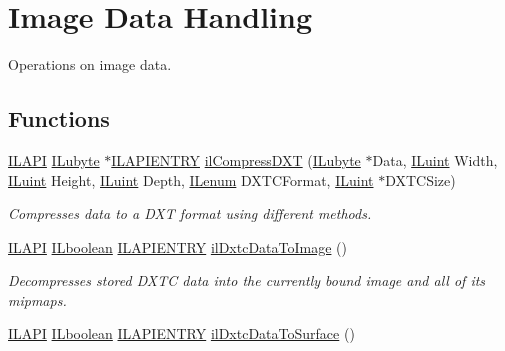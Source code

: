 \hypertarget{group__data}{\section{Image Data Handling}
\label{group__data}
}


Operations on image data.  


\subsection*{Functions}
\begin{DoxyCompactItemize}
\item 
\hyperlink{_i_l_8h_aedb0c8b2b033d0612e3d784d2f598758}{I\+L\+A\+P\+I} \hyperlink{group__il__types_ga057357939bc5a12e8061715453568519}{I\+Lubyte} $\ast$\hyperlink{_i_l_8h_a69c08a8d06df986f7e46f209d131ef2f}{I\+L\+A\+P\+I\+E\+N\+T\+R\+Y} \hyperlink{group__data_ga016b03ccbf86f6ba37d6c24b3357f9d1}{il\+Compress\+D\+X\+T} (\hyperlink{group__il__types_ga057357939bc5a12e8061715453568519}{I\+Lubyte} $\ast$Data, \hyperlink{group__il__types_gaff8e86a1072c8d7cfe387fb87c6ed8e1}{I\+Luint} Width, \hyperlink{group__il__types_gaff8e86a1072c8d7cfe387fb87c6ed8e1}{I\+Luint} Height, \hyperlink{group__il__types_gaff8e86a1072c8d7cfe387fb87c6ed8e1}{I\+Luint} Depth, \hyperlink{group__il__types_ga62ca73445716183ef42b1f3906a45ed0}{I\+Lenum} D\+X\+T\+C\+Format, \hyperlink{group__il__types_gaff8e86a1072c8d7cfe387fb87c6ed8e1}{I\+Luint} $\ast$D\+X\+T\+C\+Size)
\begin{DoxyCompactList}\small\item\em Compresses data to a D\+X\+T format using different methods. \end{DoxyCompactList}\item 
\hyperlink{_i_l_8h_aedb0c8b2b033d0612e3d784d2f598758}{I\+L\+A\+P\+I} \hyperlink{group__il__types_gaa6aa7c95cfdc06b4d8601ef832b7bb0a}{I\+Lboolean} \hyperlink{_i_l_8h_a69c08a8d06df986f7e46f209d131ef2f}{I\+L\+A\+P\+I\+E\+N\+T\+R\+Y} \hyperlink{group__data_ga8faac0b5b4f410b903b1bc4b825fc345}{il\+Dxtc\+Data\+To\+Image} ()
\begin{DoxyCompactList}\small\item\em Decompresses stored D\+X\+T\+C data into the currently bound image and all of its mipmaps. \end{DoxyCompactList}\item 
\hyperlink{_i_l_8h_aedb0c8b2b033d0612e3d784d2f598758}{I\+L\+A\+P\+I} \hyperlink{group__il__types_gaa6aa7c95cfdc06b4d8601ef832b7bb0a}{I\+Lboolean} \hyperlink{_i_l_8h_a69c08a8d06df986f7e46f209d131ef2f}{I\+L\+A\+P\+I\+E\+N\+T\+R\+Y} \hyperlink{group__data_ga1357342a2f78514311614044bc6adee2}{il\+Dxtc\+Data\+To\+Surface} ()

\end{DoxyCompactItemize}
